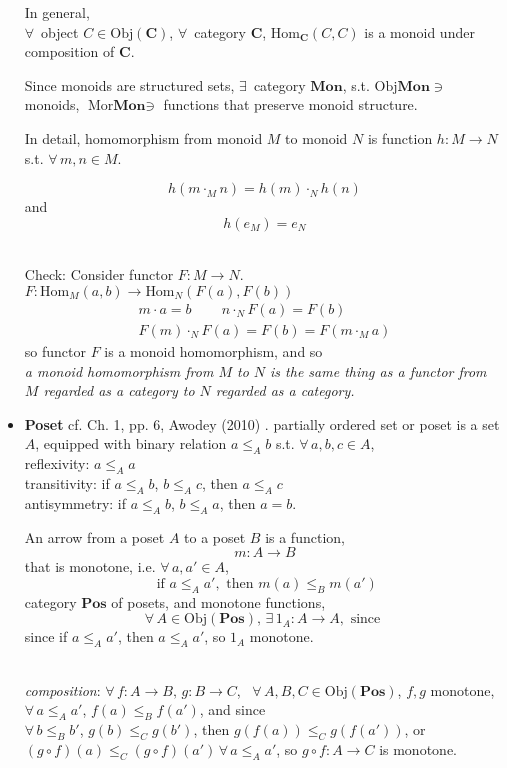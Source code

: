 \documentclass[10pt]{amsart}
\begin{document}
\begin{multicols*}{2}
\begin{itemize}
	In general, \\
	$\forall \, $ object $C \in \text{Obj}(\mathbf{C})$, $\forall \, $ category $\mathbf{C}$, $\text{Hom}_{\mathbf{C}}(C,C)$ is a monoid under composition of $\mathbf{C}$. 
	
	Since monoids are structured sets, $\exists \, $ category $\textbf{Mon}$, s.t. $\text{Obj}\mathbf{Mon} \ni $ monoids, $\text{Mor} \textbf{Mon} \ni $ functions that preserve monoid structure.
	
	In detail, homomorphism from monoid $M$ to monoid $N$ is function $h:M \to N$ s.t. $\forall \, m,n \in M$. 
	
	\[
	h(m \cdot_M n) = h(m) \cdot_N h(n)
	\]
	and
	\[
	h(e_M) =  e_N
	\]
	
	\quad \\ 
	Check: Consider functor $F: M \to N$. \\
	$F: \text{Hom}_M(a,b) \to \text{Hom}_N(F(a), F(b))$
	\[
	\begin{gathered}
	m\cdot a =b \qquad \, n \cdot_N F(a)  = F(b) \\
	F(m) \cdot_N F(a) = F(b) = F(m \cdot_M a) 
	\end{gathered}
	\]
	so functor $F$ is a monoid homomorphism, and so \\
	\emph{a monoid homomorphism from $M$ to $N$ is the same thing as a functor from $M$ regarded as a category to $N$ regarded as a category.}
	\item \textbf{Poset} cf. Ch. 1, pp. 6, Awodey (2010) \cite{Awod2010}. partially ordered set or poset is a set $A$, equipped with binary relation $a \leq_A b$ s.t. $\forall \, a, b, c \in A$, \\
	reflexivity: $a \leq_A a$ \\
	transitivity: if $a\leq_A b$, $b\leq_A c$, then $a\leq_A  c$ \\
	antisymmetry: if $a\leq_A b$, $b\leq_A a$, then $a=b$.
	
	An arrow from a poset $A$ to a poset $B$ is a function,
	\[
	m : A \to B
	\]
that is monotone, i.e. $\forall \, a, a' \in A$, 
\[
\text{ if } a \leq_A a', \text{ then } m(a) \leq_B m(a')
\]	
category $\textbf{Pos}$ of posets, and monotone functions, 
\[
\forall \, A \in \text{Obj}(\textbf{Pos}), \, \exists \, 1_A : A \to A, \text{ since } 
\]
since if $a \leq_A a'$, then $a\leq_A a'$, so $1_A$ monotone.

\quad \\ 
\emph{composition}: $\forall \, f:A \to B, \, g:B \to C$, \, $\forall \, A,B,C \in \text{Obj}(\textbf{Pos})$, $f,g$ monotone, \\
$\forall \, a \leq_A a'$, $f(a) \leq_B f(a')$, and since \\
$\forall \, b \leq_B b'$, $g(b) \leq_C g(b')$, then $g(f(a)) \leq_C g(f(a'))$, or $(g\circ f)(a) \leq_C (g\circ f)(a') \, \forall \, a\leq_A a'$, so $g\circ f : A \to C$ is monotone.


\end{itemize}
\end{multicols*}
\end{document}

